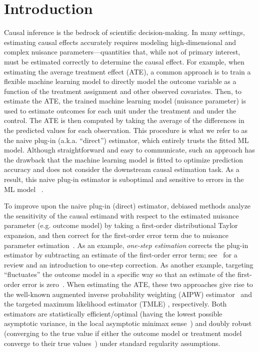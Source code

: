 \section{Introduction}
\label{sec:intro}

Causal inference is the bedrock of scientific decision-making. In many settings, estimating causal effects accurately requires modeling high-dimensional and complex nuisance parameters---quantities that, while not of primary interest, must be estimated correctly to determine the causal effect.
For example, when estimating the average treatment effect (ATE), a common approach is to train a flexible machine learning model to directly model the outcome variable as a function of the treatment assignment and other observed covariates. Then, to estimate the ATE, the trained machine learning model (nuisance parameter) is used to estimate outcomes for each unit under the treatment and under the control. The ATE is then computed by taking the average of the differences in the predicted values for each observation. This procedure is what we refer to as the naive plug-in (a.k.a. ``direct'') estimator, which entirely trusts the fitted ML model. Although straightforward and easy to communicate, such an approach has the drawback that the machine learning model is fitted to optimize prediction accuracy and does not consider the downstream causal estimation task. 
As a result, this %
naive plug-in estimator 
is suboptimal and sensitive to errors in the ML model %
~\citep{BickelKlRiWe98,ChernozhukovChDeDuHaNeRo18,VanDerLaanRo11,Kennedy22}.

 To improve upon the naive plug-in (direct) estimator,
debiased methods analyze the sensitivity of the causal estimand with respect to the estimated nuisance parameter (e.g. outcome model) by taking a first-order distributional Taylor expansion, and then correct for the first-order error term due to nuisance parameter estimation~\cite{BickelKlRiWe98,pfanzagl1985contributions,ChernozhukovChDeDuHaNeRo18,VanDerLaanRo11,van2006targeted,Newey94}. As an example,
 \emph{one-step estimation} corrects the plug-in estimator by subtracting an estimate of the first-order error term; see~\cite{Kennedy22,fisher2019} for a review and an introduction to one-step correction. 
As another example, targeting ``fluctuates'' the outcome model in a specific way so that an estimate of the first-order error is zero~\citep{VanDerLaanRo11,van2006targeted}.  When estimating the ATE, these two approaches give rise to the well-known augmented inverse probability weighting  (AIPW) estimator~\citep{Bang2005DoublyRE} 
and the targeted maximum likelihood  estimator (TMLE) \citep{VanDerLaanRo11,van2006targeted}, respectively. Both estimators are statistically efficient/optimal (having the lowest possible asymptotic variance, in the local asymptotic minimax sense~\citep{van2000asymptotic}) and doubly robust (converging to the true value if either the outcome model or treatment model converge to their true values~\citep{Bang2005DoublyRE}) under standard regularity assumptions. %




